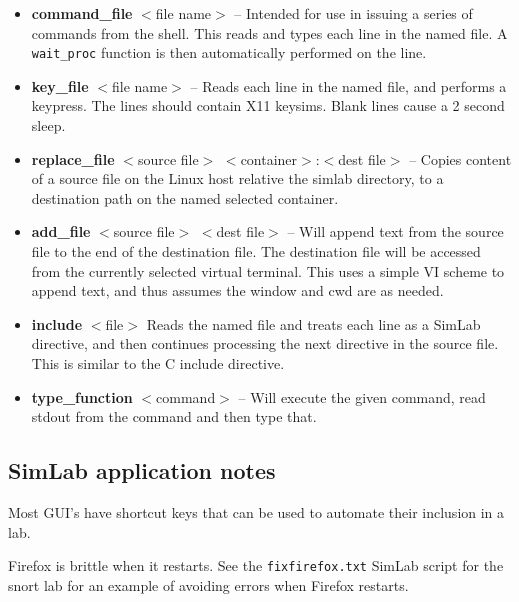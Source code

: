 \documentclass[12pt]{article}
\begin{document}
\begin{itemize}
\item \textbf{command\_file} $<$file name$>$ -- Intended for use in issuing a series of
commands from the shell.  This reads and types each line in the named file.
A {\tt wait\_proc} function is then automatically performed on the line.
\item \textbf{key\_file} $<$file name$>$ -- Reads each line in the named file, and performs
a keypress.  The lines should contain X11 keysims.  Blank lines cause a 2 second sleep.
\item \textbf{replace\_file} $<$source file$>$ $<$container$>$:$<$dest file$>$ -- Copies content of a source
file on the Linux host relative the simlab directory, to a destination path on the named selected container.  
\item \textbf{add\_file} $<$source file$>$ $<$dest file$>$ -- Will append text from the source file to the 
end of the destination file.  The destination file will be accessed from the currently selected virtual
terminal.  This uses a simple VI scheme to append text, and thus assumes the window and cwd are as needed.
\item \textbf{include} $<$file$>$ Reads the named file and treats each line as a SimLab directive,
and then continues processing the next directive in the source file.  This is similar to the C
include directive.
\item \textbf{type\_function} $<$command$>$ -- Will execute the given command, read stdout from the 
command and then type that.

\end{itemize}
\subsection{SimLab application notes}
\label{simlab_notes}
Most GUI's have shortcut keys that can be used to automate their inclusion in a lab.

Firefox is brittle when it restarts.  See the {\tt fixfirefox.txt} SimLab script for the snort lab
for an example of avoiding errors when Firefox restarts.
\end{document}
